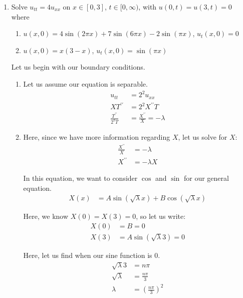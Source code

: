 \documentclass{article}
\begin{document}
\begin{enumerate}
%
%
  \item Solve $u_{tt} = 4u_{xx}$ on $x \in [0, 3]$, $t \in [0, \infty)$, with $u(0, t) = u(3, t) = 0$ where

  \begin{enumerate}
    \item $u(x, 0) = 4 \sin(2 \pi x) + 7 \sin(6 \pi x) - 2\sin(\pi x)$, $u_t(x, 0) = 0$
    \item $u(x, 0) = x(3 - x)$, $u_t(x, 0) = \sin(\pi x)$
  \end{enumerate}

  Let us begin with our boundary conditions.
  \begin{enumerate}
    \item Let us assume our equation is separable.
    \begin{align}
      u_{tt} & = 2^2 u_{xx}\\
      XT^{\prime\prime} & = 2^2 X^{\prime\prime}T\\
      \frac{T^{\prime\prime}}{2^2 T} & = \frac{X^{\prime\prime}}{X} = - \lambda
    \end{align}

    \item Here, since we have more information regarding $X$, let us solve for $X$:
    \begin{align}
      \frac{X^{\prime\prime}}{X} & = - \lambda\\
      X^{\prime\prime} & = - \lambda X
    \end{align}

    In this equation, we want to consider $\cos$ and $\sin$ for our general equation.
    \begin{align}
      X(x) & = A \sin(\sqrt \lambda x) + B \cos (\sqrt \lambda x)
    \end{align}

    Here, we know $X(0) = X(3) = 0$, so let us write:
    \begin{align}
      X(0) & = B = 0\\
      X(3) & = A \sin(\sqrt \lambda 3) = 0
    \end{align}

     Here, let us find when our sine function is $0$.
     \begin{align}
       \sqrt \lambda 3 & = n \pi\\
       \sqrt \lambda & = \frac{n \pi}{3}\\
       \lambda & = \left( \frac{n \pi}{3} \right)^2
     \end{align}


\end{enumerate}
\end{enumerate}
\end{document}
